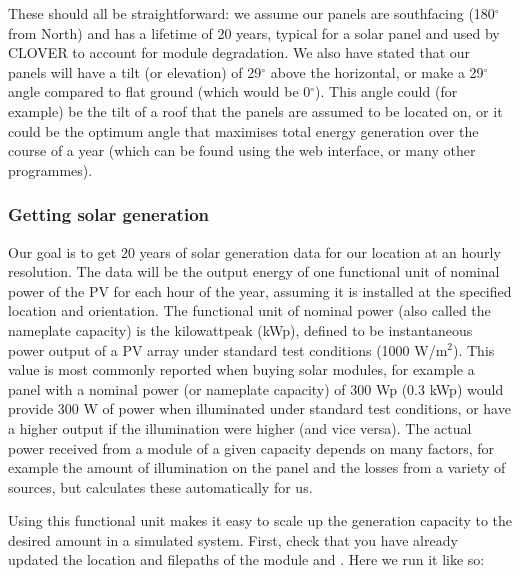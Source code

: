 \documentclass[letterpaper,10pt,english]{sphinxmanual}
\begin{document}
\begin{DUlineblock}{0em}
\item[] 
\end{DUlineblock}

\sphinxAtStartPar
These should all be straightforward: we assume our panels are
south\sphinxhyphen{}facing (180\(^{\circ}\) from North) and has a lifetime of 20
years, typical for a solar panel and used by CLOVER to account for
module degradation. We also have stated that our panels will have a tilt
(or elevation) of 29\(^{\circ}\) above the horizontal, or make a
29\(^{\circ}\) angle compared to flat ground (which would be
0\(^{\circ}\)). This angle could (for example) be the tilt of a
roof that the panels are assumed to be located on, or it could be the
optimum angle that maximises total energy generation over the course of
a year (which can be found using the  web interface,
or many other programmes).


\subsubsection{Getting solar generation}
\label{\detokenize{electricity_generation:getting-solar-generation}}
\sphinxAtStartPar
Our goal is to get 20 years of solar generation data for our location at
an hourly resolution. The data will be the output energy of one
functional unit of nominal power of the PV for each hour of the year,
assuming it is installed at the specified location and orientation. The
functional unit of nominal power (also called the nameplate capacity) is
the kilowatt\sphinxhyphen{}peak (kWp), defined to be instantaneous power output of a
PV array under standard test conditions (1000 W/m\(^2\)). This
value is most commonly reported when buying solar modules, for example a
panel with a nominal power (or nameplate capacity) of 300 Wp (0.3 kWp)
would provide 300 W of power when illuminated under standard test
conditions, or have a higher output if the illumination were higher (and
vice versa). The actual power received from a module of a given capacity
depends on many factors, for example the amount of illumination on the
panel and the losses from a variety of sources, but 
calculates these automatically for us.

\sphinxAtStartPar
Using this functional unit makes it easy to scale up the generation
capacity to the desired amount in a simulated system. First, check that
you have already updated the location and filepaths of the 
module and . Here we run it like so:
\end{document}
